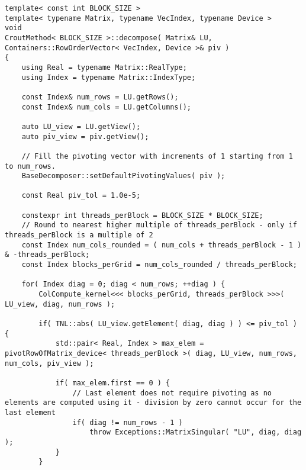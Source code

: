 \begin{lstlisting}[caption={Excerpt from the implementation of PCM\_\textit{x}PP.
The template parameter \code{BLOCK\_SIZE} is equivalent to \textit{x} in PCM\_\textit{x}PP.
On input, matrix \code{LU} is assumed to contain the values of $\mathbf{A}$, and \code{piv} is expected to be appropriately sized.
Furthermore, unlike \code{LU}, \code{piv} is assumed to be allocated on the Host.
The \code{pivotRowOfMatrix\_device()} function, presented below the \code{decompose()} method, is implemented in the parent class of \code{CroutMethod}: \code{BaseDecomposer}.
Note that the code has been slightly modified for brevity.
For example, the \code{swapRows\_device()} function has been omitted as it is a basic operation, and the checks for appropriate sizing of matrices/vectors have been removed.},label={Listing:PCMxPP-implementation-excerpt}]
template< const int BLOCK_SIZE >
template< typename Matrix, typename VecIndex, typename Device >
void
CroutMethod< BLOCK_SIZE >::decompose( Matrix& LU, Containers::RowOrderVector< VecIndex, Device >& piv )
{
	using Real = typename Matrix::RealType;
	using Index = typename Matrix::IndexType;
	
	const Index& num_rows = LU.getRows();
	const Index& num_cols = LU.getColumns();
	
	auto LU_view = LU.getView();
	auto piv_view = piv.getView();
	
	// Fill the pivoting vector with increments of 1 starting from 1 to num_rows.
	BaseDecomposer::setDefaultPivotingValues( piv );
	
	const Real piv_tol = 1.0e-5;
	
	constexpr int threads_perBlock = BLOCK_SIZE * BLOCK_SIZE;
	// Round to nearest higher multiple of threads_perBlock - only if threads_perBlock is a multiple of 2
	const Index num_cols_rounded = ( num_cols + threads_perBlock - 1 ) & -threads_perBlock;
	const Index blocks_perGrid = num_cols_rounded / threads_perBlock;
	
	for( Index diag = 0; diag < num_rows; ++diag ) {
		ColCompute_kernel<<< blocks_perGrid, threads_perBlock >>>( LU_view, diag, num_rows );
		
		if( TNL::abs( LU_view.getElement( diag, diag ) ) <= piv_tol ) {
			std::pair< Real, Index > max_elem = pivotRowOfMatrix_device< threads_perBlock >( diag, LU_view, num_rows, num_cols, piv_view );
			
			if( max_elem.first == 0 ) {
				// Last element does not require pivoting as no elements are computed using it - division by zero cannot occur for the last element
				if( diag != num_rows - 1 )
					throw Exceptions::MatrixSingular( "LU", diag, diag );
			}
		}
		

\end{lstlisting}
